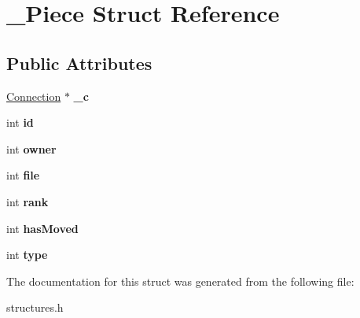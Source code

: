 \hypertarget{struct__Piece}{
\section{\_\-Piece Struct Reference}
\label{struct__Piece}
}
\subsection*{Public Attributes}
\begin{DoxyCompactItemize}
\item 
\hypertarget{struct__Piece_a27a804a17819202f45180b5468e22bee}{
\hyperlink{structConnection}{Connection} $\ast$ {\bfseries \_\-c}}
\label{struct__Piece_a27a804a17819202f45180b5468e22bee}

\item 
\hypertarget{struct__Piece_a9c62797ec51d6cf98e5aa29cc3a29200}{
int {\bfseries id}}
\label{struct__Piece_a9c62797ec51d6cf98e5aa29cc3a29200}

\item 
\hypertarget{struct__Piece_acbb79e5a926fec2cc5d938c8609a6ac2}{
int {\bfseries owner}}
\label{struct__Piece_acbb79e5a926fec2cc5d938c8609a6ac2}

\item 
\hypertarget{struct__Piece_a8fe586cdc7896df45867044f81ace54e}{
int {\bfseries file}}
\label{struct__Piece_a8fe586cdc7896df45867044f81ace54e}

\item 
\hypertarget{struct__Piece_a2e0b676d33598ba6744d3e25aad0e8f0}{
int {\bfseries rank}}
\label{struct__Piece_a2e0b676d33598ba6744d3e25aad0e8f0}

\item 
\hypertarget{struct__Piece_a4c1a6d590e1b561b759953eab59acfdf}{
int {\bfseries hasMoved}}
\label{struct__Piece_a4c1a6d590e1b561b759953eab59acfdf}

\item 
\hypertarget{struct__Piece_a6f6b6273987d40957383c71403d01ade}{
int {\bfseries type}}
\label{struct__Piece_a6f6b6273987d40957383c71403d01ade}

\end{DoxyCompactItemize}


The documentation for this struct was generated from the following file:\begin{DoxyCompactItemize}
\item 
structures.h\end{DoxyCompactItemize}
